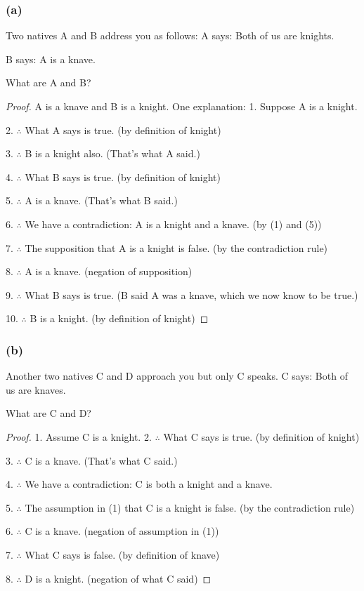 \documentclass[14pt]{extarticle}
\begin{document}
\subsubsection{(a)} Two natives A and B address you as follows:
A says: Both of us are knights.

B says: A is a knave.

What are A and B?

\begin{proof} A is a knave and B is a knight. One explanation:
1. Suppose A is a knight.

2. $\therefore$ What A says is true. (by definition of knight)

3. $\therefore$ B is a knight also. (That’s what A said.)

4. $\therefore$ What B says is true. (by definition of knight)

5. $\therefore$ A is a knave. (That’s what B said.)

6. $\therefore$ We have a contradiction: A is a knight and a knave. (by (1) and
(5))

7. $\therefore$ The supposition that A is a knight is false. (by the
contradiction rule)

8. $\therefore$ A is a knave. (negation of supposition)

9. $\therefore$ What B says is true. (B said A was a knave, which we now know to
be true.)

10. $\therefore$ B is a knight. (by definition of knight) \end{proof}
\subsubsection{(b)} Another two natives C and D approach you but only C speaks.
C says: Both of us are knaves.

What are C and D?

\begin{proof} 1. Assume C is a knight.
2. $\therefore$ What C says is true. (by definition of knight)

3. $\therefore$ C is a knave. (That's what C said.)

4. $\therefore$ We have a contradiction: C is both a knight and a knave.

5. $\therefore$ The assumption in (1) that C is a knight is false. (by the
contradiction rule)

6. $\therefore$ C is a knave. (negation of assumption in (1))

7. $\therefore$ What C says is false. (by definition of knave)

8. $\therefore$ D is a knight. (negation of what C said) \end{proof}
\end{document}
